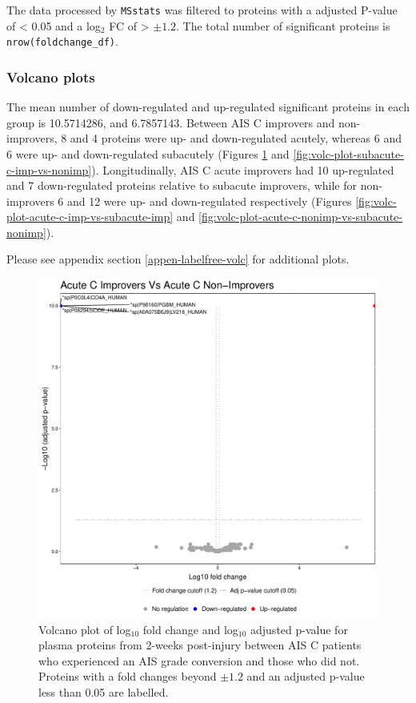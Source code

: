 \documentclass[
]{article}
\begin{document}
The data processed by \texttt{MSstats} was filtered to proteins with a adjusted P-value of \textless{} 0.05 and a log\(_2\) FC of \textgreater{} \(\pm1.2\).
The total number of significant proteins is \texttt{nrow(foldchange\_df)}.

\hypertarget{volcano-plots}{%
\subsubsection{Volcano plots}\label{volcano-plots}}

The mean number of down-regulated and up-regulated significant proteins in each group is 10.5714286, and 6.7857143.
Between AIS C improvers and non-improvers, 8 and 4 proteins were up- and down-regulated acutely, whereas 6 and 6 were up- and down-regulated subacutely (Figures \ref{fig:volc-plot-c-imp-vs-nonimp} and \ref{fig:volc-plot-subacute-c-imp-vs-nonimp}).
Longitudinally, AIS C acute improvers had 10 up-regulated and 7 down-regulated proteins relative to subacute improvers, while for non-improvers 6 and 12 were up- and down-regulated respectively (Figures \ref{fig:volc-plot-acute-c-imp-vs-subacute-imp} and \ref{fig:volc-plot-acute-c-nonimp-vs-subacute-nonimp}).

Please see appendix section \ref{appen-labelfree-volc} for additional plots.

\clearpage



\begin{figure}
\includegraphics[width=1\linewidth]{figures/openms_protein_quantification/label_free/openms_volcano_plot_2021-08-10_0008} \caption{Volcano plot of log\(_10\) fold change and log\(_10\) adjusted p-value for plasma proteins from 2-weeks post-injury between AIS C patients who experienced an AIS grade conversion and those who did not. Proteins with a fold changes beyond \(\pm 1.2\) and an adjusted p-value less than 0.05 are labelled.}\label{fig:volc-plot-c-imp-vs-nonimp}
\end{figure}
\end{document}
